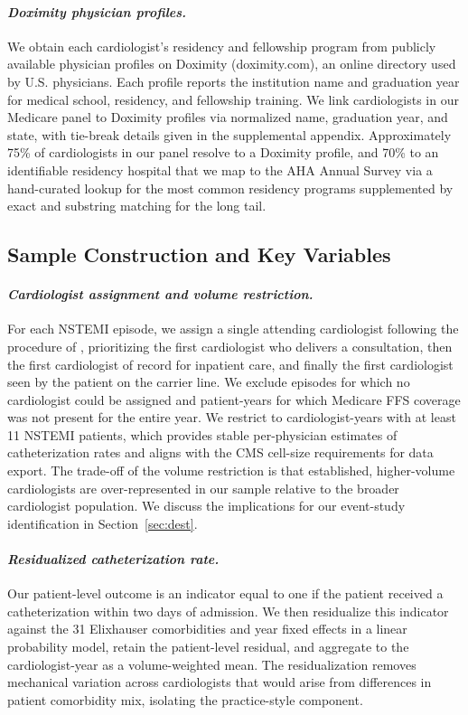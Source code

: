 \documentclass[12pt]{article}
\let\textcite\citet
\begin{document}
\paragraph{\textit{Doximity physician profiles.}}
We obtain each cardiologist's residency and fellowship program from publicly available physician profiles on Doximity (doximity.com), an online directory used by U.S. physicians. Each profile reports the institution name and graduation year for medical school, residency, and fellowship training. We link cardiologists in our Medicare panel to Doximity profiles via normalized name, graduation year, and state, with tie-break details given in the supplemental appendix. Approximately 75\% of cardiologists in our panel resolve to a Doximity profile, and 70\% to an identifiable residency hospital that we map to the AHA Annual Survey via a hand-curated lookup for the most common residency programs supplemented by exact and substring matching for the long tail.

\subsection{Sample Construction and Key Variables}
\label{sec:sample}

\paragraph{\textit{Cardiologist assignment and volume restriction.}}
For each NSTEMI episode, we assign a single attending cardiologist following the procedure of \textcite{molitor2018}, prioritizing the first cardiologist who delivers a consultation, then the first cardiologist of record for inpatient care, and finally the first cardiologist seen by the patient on the carrier line. We exclude episodes for which no cardiologist could be assigned and patient-years for which Medicare FFS coverage was not present for the entire year. We restrict to cardiologist-years with at least 11 NSTEMI patients, which provides stable per-physician estimates of catheterization rates and aligns with the CMS cell-size requirements for data export. The trade-off of the volume restriction is that established, higher-volume cardiologists are over-represented in our sample relative to the broader cardiologist population. We discuss the implications for our event-study identification in Section~\ref{sec:dest}.

\paragraph{\textit{Residualized catheterization rate.}}
Our patient-level outcome is an indicator equal to one if the patient received a catheterization within two days of admission. We then residualize this indicator against the 31 Elixhauser comorbidities and year fixed effects in a linear probability model, retain the patient-level residual, and aggregate to the cardiologist-year as a volume-weighted mean. The residualization removes mechanical variation across cardiologists that would arise from differences in patient comorbidity mix, isolating the practice-style component.
\end{document}
